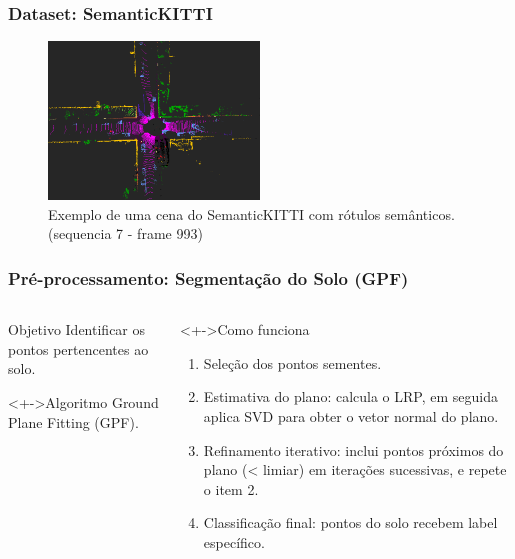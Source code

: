 \documentclass[aspectratio=169,t,xcolor=table]{beamer}
\begin{document}
\begin{frame}
    \frametitle{Dataset: SemanticKITTI}
    \begin{figure}
        \centering
        \includegraphics [width=0.5\textwidth]{figs/final-true1t.png}
        \caption {Exemplo de uma cena do SemanticKITTI com rótulos semânticos.
            (sequencia 7 - frame 993)}
    \end{figure}
\end{frame}

\begin{frame}
    \frametitle{Pré-processamento: Segmentação do Solo (GPF)}
    \begin{columns}[T]
        \begin{column}{.4\textwidth}
            \begin{block}{Objetivo}
                \vspace{0.5em}
                Identificar os pontos pertencentes ao solo.
                \vspace{0.5em}
            \end{block}
            \begin{block}<+->{Algoritmo}
                \vspace{0.5em}
                Ground Plane Fitting (GPF).
                \vspace{0.5em}
            \end{block}
        \end{column}
        \begin{column}{.6\textwidth}
            \begin{block}<+->{Como funciona}
                \begin{enumerate}[<+->]
                    \item Seleção dos pontos sementes.
                    \item Estimativa do plano: calcula o LRP, em seguida aplica
                          SVD para obter o vetor normal do plano.
                    \item Refinamento iterativo: inclui pontos próximos do plano
                          (< limiar) em iterações sucessivas, e repete o item 2.
                    \item Classificação final: pontos do solo recebem label
                          específico.
                \end{enumerate}
            \end{block}
        \end{column}
    \end{columns}
\end{frame}
\end{document}
